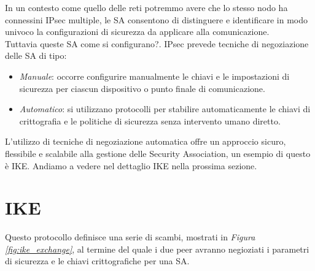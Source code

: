 In un contesto come quello delle reti potremmo avere che lo stesso nodo ha connessini IPsec multiple, 
le SA consentono di distinguere e identificare in modo univoco la configurazioni di sicurezza da applicare alla comunicazione.\\
Tuttavia queste SA come si configurano?.
IPsec prevede tecniche di negoziazione delle SA di tipo:

\begin{itemize}
    \item \textit{Manuale}: occorre configurire manualmente le chiavi e le
    impostazioni di sicurezza per ciascun dispositivo o punto finale di
    comunicazione.
    \item \textit{Automatico}: si utilizzano protocolli per stabilire
    automaticamente le chiavi di crittografia e le politiche di sicurezza senza
    intervento umano diretto.
\end{itemize}
\noindent
L'utilizzo di tecniche di negoziazione automatica offre un approccio sicuro, flessibile e scalabile alla gestione delle Security Association, un esempio di questo è IKE.
Andiamo a vedere nel dettaglio IKE nella prossima sezione.

\newpage
\section{IKE}

Questo protocollo definisce una serie di scambi, mostrati in \textit{Figura \ref{fig:ike_exchange}}, al termine del quale i due peer avranno negioziati i parametri di sicurezza e le chiavi crittografiche per una SA.

